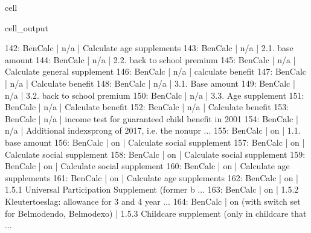 \documentclass[letterpaper,10pt,english]{sphinxmanual}
\begin{document}
\begin{sphinxuseclass}{cell}
\begin{sphinxuseclass}{cell_output}
\begin{sphinxVerbatim}[commandchars=\\\{\}]
142: BenCalc     | n/a                                                      |    Calculate age supplements 
143: BenCalc     | n/a                                                      |    2.1. base amount 
144: BenCalc     | n/a                                                      |    2.2. back to school premium 
145: BenCalc     | n/a                                                      |    Calculate general supplement 
146: BenCalc     | n/a                                                      |    calculate benefit 
147: BenCalc     | n/a                                                      |    Calculate benefit 
148: BenCalc     | n/a                                                      |    3.1. Base amount 
149: BenCalc     | n/a                                                      |    3.2. back to school premium 
150: BenCalc     | n/a                                                      |    3.3. Age supplement 
151: BenCalc     | n/a                                                      |    Calculate benefit 
152: BenCalc     | n/a                                                      |    Calculate benefit 
153: BenCalc     | n/a                                                      |    income test for guaranteed child benefit in 2001 
154: BenCalc     | n/a                                                      |    Additional \PYGZsq{}indexsprong of 2017\PYGZsq{}, i.e. the non\PYGZhy{}upr ... 
155: BenCalc     | on                                                       |    1.1. base amount 
156: BenCalc     | on                                                       |    Calculate social supplement 
157: BenCalc     | on                                                       |    Calculate social supplement 
158: BenCalc     | on                                                       |    Calculate social supplement 
159: BenCalc     | on                                                       |    Calculate social supplement 
160: BenCalc     | on                                                       |    Calculate age supplements 
161: BenCalc     | on                                                       |    Calculate age supplements 
162: BenCalc     | on                                                       |    1.5.1 Universal Participation Supplement (former b ... 
163: BenCalc     | on                                                       |    1.5.2  Kleutertoeslag: allowance for 3 and 4 year  ... 
164: BenCalc     | on (with switch set for Belmod\PYGZus{}endo, Belmod\PYGZus{}exo)         |    1.5.3 Childcare supplement (only in childcare that ... 

\end{sphinxVerbatim}
\end{sphinxuseclass}
\end{sphinxuseclass}
\end{document}
